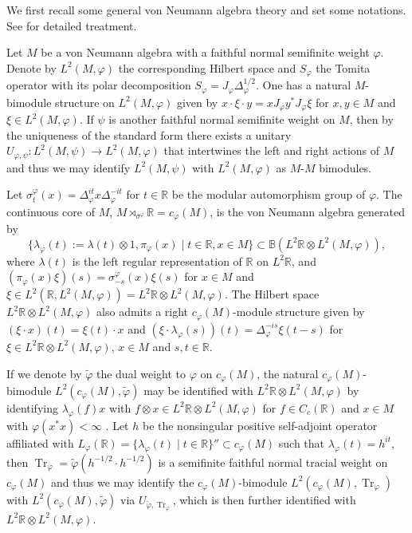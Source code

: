 \documentclass[a4paper,11pt]{amsart}
\theoremstyle{definition}
\newcommand{\B}{{\mathbb B}}
\newcommand{\R}{{\mathbb R}}
\newcommand{\Tr}{\operatorname{Tr}}
\newcommand{\ot}{\otimes}
\begin{document}
We first recall some general von Neumann algebra theory and set some notations. See \cite{Take03} for detailed treatment.

Let $M$ be a von Neumann algebra with a faithful normal semifinite weight $\varphi$.
Denote by $L^2(M,\varphi)$ the corresponding Hilbert space and $S_\varphi$ the Tomita operator
	with its polar decomposition $S_\varphi=J_\varphi \Delta_\varphi^{1/2}$.
One has a natural $M$-bimodule structure on $L^2(M,\varphi)$ given by $x\cdot \xi \cdot y=x J_\varphi y^* J_\varphi \xi$ for $x,y\in M$
	and $\xi\in L^2(M,\varphi)$.
If $\psi$ is another faithful normal semifinite weight on $M$,
	then by the uniqueness of the standard form there exists a unitary
	$U_{\varphi,\psi}: L^2(M,\psi)\to L^2(M,\varphi)$
	that intertwines the left and right actions of $M$
	and thus we may identify $L^2(M,\psi)$ with $L^2(M,\varphi)$ as $M$-$M$ bimodules.
	
Let $\sigma^\varphi_t(x)=\Delta_\varphi^{it}x \Delta_{\varphi}^{-it}$ for $t\in \R$ be the modular automorphism group of $\varphi$.
The continuous core of $M$, $M\rtimes_{\sigma^\varphi}\R=c_\varphi(M)$, is the von Neumann algebra generated by
$$
\{\lambda_\varphi(t):=\lambda(t)\ot 1, \pi_\varphi(x)\mid t\in \R, x\in M\}\subset \B(L^2\R\ot L^2(M,\varphi)),
$$
where $\lambda(t)$ is the left regular representation of $\R$ on $L^2\R$,
	and $(\pi_\varphi(x)\xi)(s)=\sigma_{-s}^\varphi(x)\xi(s)$
	for $x\in M$ and $\xi\in L^2(\R, L^2(M,\varphi))=L^2\R\ot L^2(M,\varphi)$.
The Hilbert space $L^2\R\ot L^2(M,\varphi)$ also admits a right $c_\varphi(M)$-module structure given by
$(\xi\cdot x)(t)=\xi(t)\cdot x$ and $(\xi\cdot \lambda_\varphi(s))(t)=\Delta_\varphi^{-is}\xi(t-s)$
	for $\xi\in L^2\R\ot L^2(M,\varphi)$, $x\in M$ and $s,t\in \R$.

If we denote by $\tilde \varphi$ the dual weight to $\varphi$ on $c_\varphi(M)$,	
	the natural $c_\varphi(M)$-bimodule $L^2(c_\varphi(M),\tilde \varphi)$ may be identified with $L^2\R\ot L^2(M,\varphi)$
	by identifying $\lambda_\varphi(f)x$ with $f\ot x\in L^2\R\ot L^2(M,\varphi)$
	for $f\in C_c(\R)$ and $x\in M$ with $\varphi(x^*x)<\infty$ \cite[Section X.1]{Take03}.
Let $h$ be the nonsingular positive self-adjoint operator affiliated with $L_\varphi(\R)=\{\lambda_\varphi(t)\mid t\in \R\}''\subset c_\varphi(M)$
	such that $\lambda_\varphi(t)=h^{it}$, then $\Tr_\varphi=\tilde \varphi(h^{-1/2}\cdot h^{-1/2})$
	is a semifinite faithful normal tracial weight on $c_\varphi(M)$
	and thus we may identify  the $c_\varphi(M)$-bimodule $L^2(c_\varphi(M),\Tr_\varphi)$
	with $L^2(c_\varphi(M),\tilde \varphi)$ via $U_{\tilde\varphi,\Tr_\varphi}$, which is then further identified with $L^2\R\ot L^2(M,\varphi)$.
\end{document}
